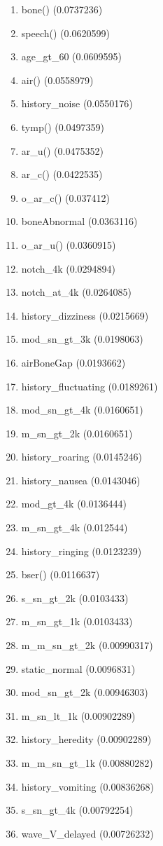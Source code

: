 \begin{enumerate}
\item bone() (0.0737236)
\item speech() (0.0620599)
\item age\_gt\_60 (0.0609595)
\item air() (0.0558979)
\item history\_noise (0.0550176)
\item tymp() (0.0497359)
\item ar\_u() (0.0475352)
\item ar\_c() (0.0422535)
\item o\_ar\_c() (0.037412)
\item boneAbnormal (0.0363116)
\item o\_ar\_u() (0.0360915)
\item notch\_4k (0.0294894)
\item notch\_at\_4k (0.0264085)
\item history\_dizziness (0.0215669)
\item mod\_sn\_gt\_3k (0.0198063)
\item airBoneGap (0.0193662)
\item history\_fluctuating (0.0189261)
\item mod\_sn\_gt\_4k (0.0160651)
\item m\_sn\_gt\_2k (0.0160651)
\item history\_roaring (0.0145246)
\item history\_nausea (0.0143046)
\item mod\_gt\_4k (0.0136444)
\item m\_sn\_gt\_4k (0.012544)
\item history\_ringing (0.0123239)
\item bser() (0.0116637)
\item s\_sn\_gt\_2k (0.0103433)
\item m\_sn\_gt\_1k (0.0103433)
\item m\_m\_sn\_gt\_2k (0.00990317)
\item static\_normal (0.0096831)
\item mod\_sn\_gt\_2k (0.00946303)
\item m\_sn\_lt\_1k (0.00902289)
\item history\_heredity (0.00902289)
\item m\_m\_sn\_gt\_1k (0.00880282)
\item history\_vomiting (0.00836268)
\item s\_sn\_gt\_4k (0.00792254)
\item wave\_V\_delayed (0.00726232)

\end{enumerate}
